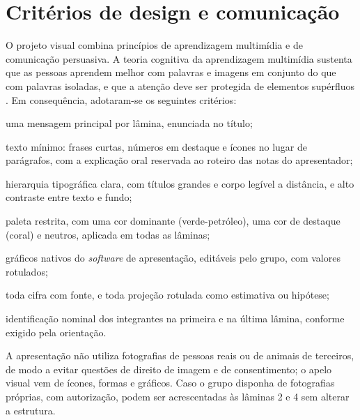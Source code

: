 \section{Critérios de design e comunicação}
\label{sec:design}

O projeto visual combina princípios de aprendizagem multimídia e de comunicação persuasiva. A teoria cognitiva da aprendizagem multimídia sustenta que as pessoas aprendem melhor com palavras e imagens em conjunto do que com palavras isoladas, e que a atenção deve ser protegida de elementos supérfluos \cite{mayer2009}. Em consequência, adotaram-se os seguintes critérios:

\begin{alineas}
  \item uma mensagem principal por lâmina, enunciada no título;
  \item texto mínimo: frases curtas, números em destaque e ícones no lugar de parágrafos, com a explicação oral reservada ao roteiro das notas do apresentador;
  \item hierarquia tipográfica clara, com títulos grandes e corpo legível a distância, e alto contraste entre texto e fundo;
  \item paleta restrita, com uma cor dominante (verde-petróleo), uma cor de destaque (coral) e neutros, aplicada em todas as lâminas;
  \item gráficos nativos do \textit{software} de apresentação, editáveis pelo grupo, com valores rotulados;
  \item toda cifra com fonte, e toda projeção rotulada como estimativa ou hipótese;
  \item identificação nominal dos integrantes na primeira e na última lâmina, conforme exigido pela orientação.
\end{alineas}

A apresentação não utiliza fotografias de pessoas reais ou de animais de terceiros, de modo a evitar questões de direito de imagem e de consentimento; o apelo visual vem de ícones, formas e gráficos. Caso o grupo disponha de fotografias próprias, com autorização, podem ser acrescentadas às lâminas 2 e 4 sem alterar a estrutura.
